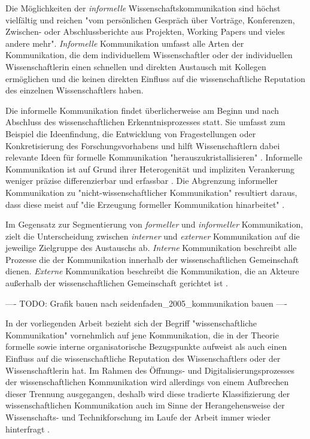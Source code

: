 Die Möglichkeiten der \textit{informelle} Wissenschaftskommunikation sind höchst vielfältig und reichen "vom persönlichen Gespräch über Vorträge, Konferenzen, Zwischen- oder Abschlussberichte aus Projekten, Working Papers und vieles andere mehr"\cite{Hanekop_2014}. \textit{Informelle} Kommunikation umfasst alle Arten der Kommunikation, die dem individuellem Wissenschaftler oder der individuellen Wissenschaftlerin einen schnellen und direkten Austausch mit Kollegen ermöglichen und die keinen direkten Einfluss auf die wissenschaftliche Reputation des einzelnen Wissenschaftlers haben.

Die informelle Kommunikation findet überlicherweise am Beginn und nach Abschluss des wissenschaftlichen Erkenntnisprozesses statt. Sie umfasst zum Beispiel die Ideenfindung, die Entwicklung von Fragestellungen oder Konkretisierung des Forschungsvorhabens und hilft Wissenschaftlern dabei relevante Ideen für formelle Kommunikation "herauszukristallisieren" \cite{Hanekop_2014}. Informelle Kommunikation ist auf Grund ihrer Heterogenität und impliziten Verankerung weniger präzise differenzierbar und erfassbar \cite{kaden_2009_library}. Die Abgrenzung informeller Kommunikation zu "nicht-wissenschaftlicher Kommunikation" resultiert daraus, dass diese meist auf "die Erzeugung formeller Kommunikation hinarbeitet" \cite{kaden_2009_library}.

Im Gegensatz zur Segmentierung von \textit{formeller} und \textit{informeller} Kommunikation, zielt die Unterscheidung zwischen \textit{interner} und \textit{externer} Kommunikation auf die jeweilige Zielgruppe des Austauschs ab. \textit{Interne} Kommunikation beschreibt alle Prozesse die der Kommunikation innerhalb der wissenschaftlichen Gemeinschaft dienen. \textit{Externe} Kommunikation beschreibt die Kommunikation, die an Akteure außerhalb der wissenschaftlichen Gemeinschaft gerichtet ist \cite{Konneker_2013}.

---- TODO: Grafik bauen nach seidenfaden_2005_kommunikation bauen ----

In der vorliegenden Arbeit bezieht sich der Begriff "wissenschaftliche Kommunikation" vornehmlich auf jene Kommunikation, die in der Theorie formelle sowie interne organisatorische Bezugspunkte aufweist als auch einen Einfluss auf die wissenschaftliche Reputation des Wissenschaftlers oder der Wissenschaftlerin hat. Im Rahmen des Öffnungs- und Digitalisierungsprozesses der wissenschaftlichen Kommunikation wird allerdings von einem Aufbrechen dieser Trennung ausgegangen, deshalb wird diese tradierte Klassifizierung der wissenschaftlichen Kommunikation auch im Sinne der Herangehensweise der Wissenschafts- und Technikforschung im Laufe der Arbeit immer wieder hinterfragt  \cite[:326]{bowker_2000_sorting}.

